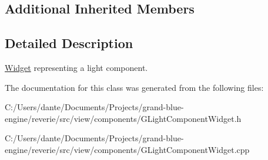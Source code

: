 \subsection*{Additional Inherited Members}


\subsection{Detailed Description}
\mbox{\hyperlink{class_widget}{Widget}} representing a light component. 

The documentation for this class was generated from the following files\+:\begin{DoxyCompactItemize}
\item 
C\+:/\+Users/dante/\+Documents/\+Projects/grand-\/blue-\/engine/reverie/src/view/components/G\+Light\+Component\+Widget.\+h\item 
C\+:/\+Users/dante/\+Documents/\+Projects/grand-\/blue-\/engine/reverie/src/view/components/G\+Light\+Component\+Widget.\+cpp\end{DoxyCompactItemize}
